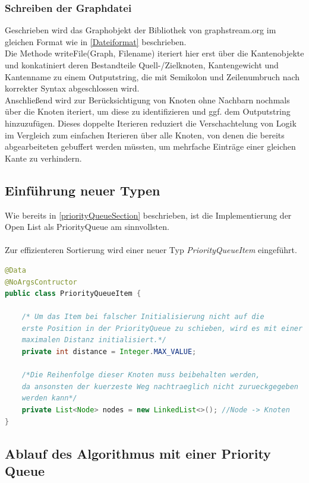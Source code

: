 \documentclass[a4paper]{article}
\begin{document}
\subsubsection{Schreiben der Graphdatei}
Geschrieben wird das Graphobjekt der Bibliothek von graphstream.org im gleichen Format wie in \ref{Dateiformat} beschrieben.\\
Die Methode writeFile(Graph, Filename) iteriert hier erst über die Kantenobjekte und konkatiniert deren Bestandteile Quell-/Zielknoten, Kantengewicht und Kantenname zu einem Outputstring, die mit Semikolon und Zeilenumbruch nach korrekter Syntax abgeschlossen wird.\\
Anschließend wird zur Berücksichtigung von Knoten ohne Nachbarn nochmals über die Knoten iteriert, um diese zu identifizieren und ggf. dem Outputstring hinzuzufügen. Dieses doppelte Iterieren reduziert die Verschachtelung von Logik im Vergleich zum einfachen Iterieren über alle Knoten, von denen die bereits abgearbeiteten gebuffert werden müssten, um mehrfache Einträge einer gleichen
Kante zu verhindern.\\
		

\subsection{Einführung neuer Typen}

Wie bereits in \ref{priorityQueueSection} beschrieben, ist die Implementierung der Open List als PriorityQueue am sinnvollsten.\\\\
Zur effizienteren Sortierung wird einer neuer Typ \textit{PriorityQueueItem} eingeführt.\\

\begin{lstlisting}[language = java, frame = trBL]
@Data
@NoArgsContructor
public class PriorityQueueItem {

    /* Um das Item bei falscher Initialisierung nicht auf die
    erste Position in der PriorityQueue zu schieben, wird es mit einer
    maximalen Distanz initialisiert.*/
    private int distance = Integer.MAX_VALUE; 

    /*Die Reihenfolge dieser Knoten muss beibehalten werden,
    da ansonsten der kuerzeste Weg nachtraeglich nicht zurueckgegeben
    werden kann*/
    private List<Node> nodes = new LinkedList<>(); //Node -> Knoten
}
\end{lstlisting}

\subsection{Ablauf des Algorithmus mit einer Priority Queue}
\end{document}
